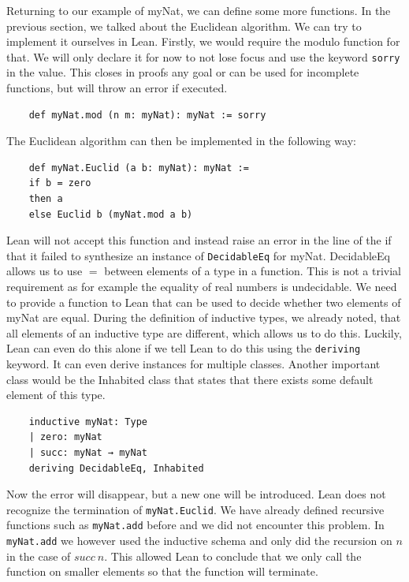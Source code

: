 Returning to our example of myNat, we can define some more functions. In the previous section, we talked about the Euclidean algorithm. We can try to implement it ourselves in Lean. Firstly, we would require the modulo function for that. We will only declare it for now to not lose focus and use the keyword \lstinline|sorry| in the value. This closes in proofs any goal or can be used for incomplete functions, but will throw an error if executed.

\begin{lstlisting}
    def myNat.mod (n m: myNat): myNat := sorry
\end{lstlisting}

The Euclidean algorithm can then be implemented in the following way:

\begin{lstlisting}
    def myNat.Euclid (a b: myNat): myNat :=
    if b = zero
    then a
    else Euclid b (myNat.mod a b)
\end{lstlisting}

Lean will not accept this function and instead raise an error in the line of the if that it failed to synthesize an instance of \lstinline|DecidableEq| for myNat. DecidableEq allows us to use $=$ between elements of a type in a function. This is not a trivial requirement as for example the equality of real numbers is undecidable\cite{EqualityRealNumber}. We need to provide a function to Lean that can be used to decide whether two elements of myNat are equal. During the definition of inductive types, we already noted, that all elements of an inductive type are different, which allows us to do this. Luckily, Lean can even do this alone if we tell Lean to do this using the \lstinline|deriving| keyword. It can even derive instances for multiple classes. Another important class would be the Inhabited class that states that there exists some default element of this type.

\begin{lstlisting}
    inductive myNat: Type
    | zero: myNat
    | succ: myNat → myNat
    deriving DecidableEq, Inhabited

\end{lstlisting}

Now the error will disappear, but a new one will be introduced. Lean does not recognize the termination of \lstinline|myNat.Euclid|. We have already defined recursive functions  such as \lstinline|myNat.add| before and we did not encounter this problem. In \lstinline|myNat.add| we however used the inductive schema and only did the recursion on $n$ in the case of $succ\ n$. This allowed Lean to conclude that we only call the function on smaller elements so that the function will terminate.

